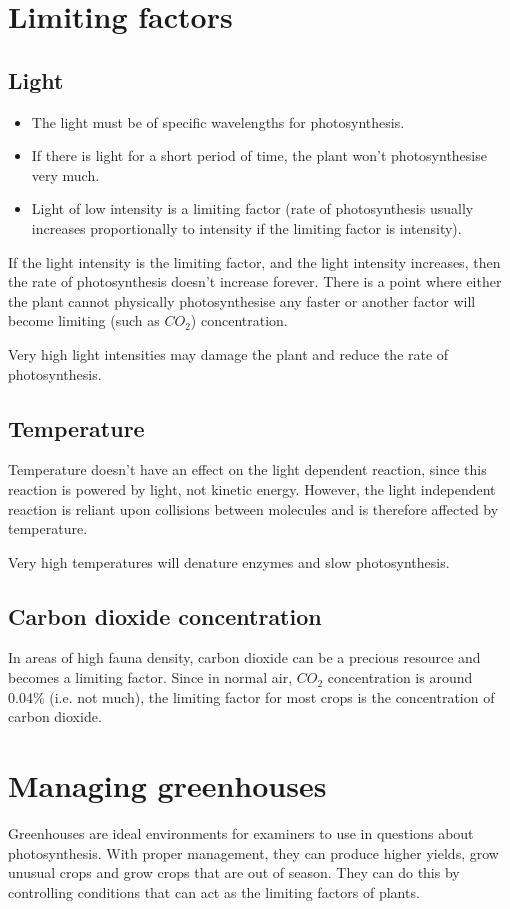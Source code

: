 \documentclass{article}
\begin{document}
\section*{Limiting factors}
\subsection*{Light}
\begin{itemize}
	\item The light must be of specific wavelengths for photosynthesis.
	\item If there is light for a short period of time, the plant won't photosynthesise very much.
	\item Light of low intensity is a limiting factor (rate of photosynthesis usually increases proportionally to intensity if the limiting factor is intensity).
\end{itemize}
If the light intensity is the limiting factor, and the light intensity increases, then the rate of photosynthesis doesn't increase forever. There is a point where either the plant cannot physically photosynthesise any faster or another factor will become limiting (such as $CO_2$) concentration.

Very high light intensities may damage the plant and reduce the rate of photosynthesis.

\subsection*{Temperature}
Temperature doesn't have an effect on the light dependent reaction, since this reaction is powered by light, not kinetic energy. However, the light independent reaction is reliant upon collisions between molecules and is therefore affected by temperature.

Very high temperatures will denature enzymes and slow photosynthesis.

\subsection*{Carbon dioxide concentration}
In areas of high fauna density, carbon dioxide can be a precious resource and becomes a limiting factor. Since in normal air, $CO_2$ concentration is around 0.04\% (i.e. not much), the limiting factor for most crops is the concentration of carbon dioxide.


\section*{Managing greenhouses}
Greenhouses are ideal environments for examiners to use in questions about photosynthesis. With proper management, they can produce higher yields, grow unusual crops and grow crops that are out of season. They can do this by controlling conditions that can act as the limiting factors of plants.
\end{document}
